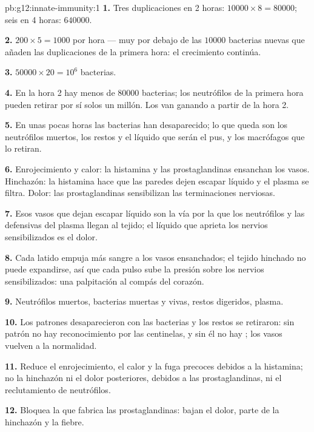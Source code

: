 \begin{solution}{pb:g12:innate-immunity:1}
\textbf{1.} Tres duplicaciones en 2 horas: $\num{10000} \times 8 =
\num{80000}$; seis en 4 horas: $\num{640000}$.

\textbf{2.} $200 \times 5 = 1000$ por hora --- muy por debajo de las
$\num{10000}$ bacterias nuevas que añaden las duplicaciones de la
primera hora: el crecimiento continúa.

\textbf{3.} $\num{50000} \times 20 = 10^6$ bacterias.

\textbf{4.} En la hora 2 hay menos de $\num{80000}$ bacterias; los
neutrófilos de la primera hora pueden retirar por sí solos un millón.
Los  van ganando a partir de la hora 2.

\textbf{5.} En unas pocas horas las bacterias han desaparecido; lo que
queda son los neutrófilos muertos, los restos y el líquido que serán el
pus, y los macrófagos que lo retiran.

\textbf{6.} Enrojecimiento y calor: la histamina y las prostaglandinas
ensanchan los vasos. Hinchazón: la histamina hace que las paredes dejen
escapar líquido y el plasma se filtra. Dolor: las prostaglandinas
sensibilizan las terminaciones nerviosas.

\textbf{7.} Esos vasos que dejan escapar líquido son la vía por la que
los neutrófilos y las  defensivas del plasma llegan al tejido;
el líquido que aprieta los nervios sensibilizados es el dolor.

\textbf{8.} Cada latido empuja más sangre a los vasos ensanchados; el
tejido hinchado no puede expandirse, así que cada pulso sube la presión
sobre los nervios sensibilizados: una palpitación al compás del
corazón.

\textbf{9.} Neutrófilos muertos, bacterias muertas y vivas, restos
digeridos, plasma.

\textbf{10.} Los patrones desaparecieron con las bacterias y los restos
se retiraron: sin patrón no hay reconocimiento por las centinelas, y
sin él no hay ; los vasos vuelven a la normalidad.

\textbf{11.} Reduce el enrojecimiento, el calor y la fuga precoces
debidos a la histamina; no la hinchazón ni el dolor posteriores,
debidos a las prostaglandinas, ni el reclutamiento de neutrófilos.

\textbf{12.} Bloquea la  que fabrica las prostaglandinas: bajan
el dolor, parte de la hinchazón y la fiebre.


\end{solution}
